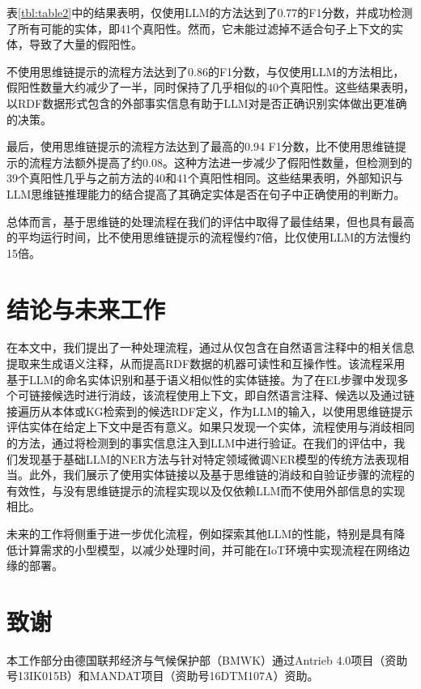 \documentclass[supercite]{Experimental_Report}
\newcommand{\rtbl}[1]{\autoref{tbl:#1}}
\theoremstyle{definition}
\begin{document}
表\rtbl{table2}中的结果表明，仅使用LLM的方法达到了0.77的F1分数，并成功检测了所有可能的实体，即41个真阳性。然而，它未能过滤掉不适合句子上下文的实体，导致了大量的假阳性。

不使用思维链提示的流程方法达到了0.86的F1分数，与仅使用LLM的方法相比，假阳性数量大约减少了一半，同时保持了几乎相似的40个真阳性。这些结果表明，以RDF数据形式包含的外部事实信息有助于LLM对是否正确识别实体做出更准确的决策。

最后，使用思维链提示的流程方法达到了最高的0.94 F1分数，比不使用思维链提示的流程方法额外提高了约0.08。这种方法进一步减少了假阳性数量，但检测到的39个真阳性几乎与之前方法的40和41个真阳性相同。这些结果表明，外部知识与LLM思维链推理能力的结合提高了其确定实体是否在句子中正确使用的判断力。

总体而言，基于思维链的处理流程在我们的评估中取得了最佳结果，但也具有最高的平均运行时间，比不使用思维链提示的流程慢约7倍，比仅使用LLM的方法慢约15倍。

\section{结论与未来工作}

在本文中，我们提出了一种处理流程，通过从仅包含在自然语言注释中的相关信息提取来生成语义注释，从而提高RDF数据的机器可读性和互操作性。该流程采用基于LLM的命名实体识别和基于语义相似性的实体链接。为了在EL步骤中发现多个可链接候选时进行消歧，该流程使用上下文，即自然语言注释、候选以及通过链接遍历从本体或KG检索到的候选RDF定义，作为LLM的输入，以使用思维链提示评估实体在给定上下文中是否有意义。如果只发现一个实体，流程使用与消歧相同的方法，通过将检测到的事实信息注入到LLM中进行验证。在我们的评估中，我们发现基于基础LLM的NER方法与针对特定领域微调NER模型的传统方法表现相当。此外，我们展示了使用实体链接以及基于思维链的消歧和自验证步骤的流程的有效性，与没有思维链提示的流程实现以及仅依赖LLM而不使用外部信息的实现相比。

未来的工作将侧重于进一步优化流程，例如探索其他LLM的性能，特别是具有降低计算需求的小型模型，以减少处理时间，并可能在IoT环境中实现流程在网络边缘的部署。

\section*{致谢}

本工作部分由德国联邦经济与气候保护部（BMWK）通过Antrieb 4.0项目（资助号13IK015B）和MANDAT项目（资助号16DTM107A）资助。


\end{document}
